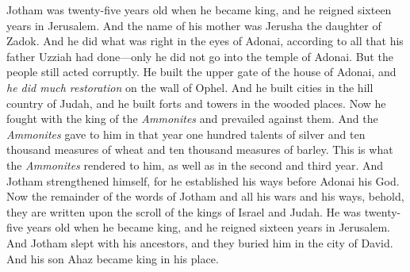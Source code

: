 \begin{biblechapter} %
 Jotham was twenty-five years old when he became king, and he reigned sixteen years in Jerusalem. And the name of his mother was Jerusha the daughter of Zadok.
\verse And he did what was right in the eyes of Adonai, according to all that his father Uzziah had done—only he did not go into the temple of Adonai. But the people still acted corruptly.
\verse He built the upper gate of the house of Adonai, and \textit{he did much restoration} on the wall of Ophel.
\verse And he built cities in the hill country of Judah, and he built forts and towers in the wooded places.
\verse Now he fought with the king of the \textit{Ammonites} and prevailed against them. And the \textit{Ammonites} gave to him in that year one hundred talents of silver and ten thousand measures of wheat and ten thousand measures of barley. This is what the \textit{Ammonites} rendered to him, as well as in the second and third year.
\verse And Jotham strengthened himself, for he established his ways before Adonai his God.
\verse Now the remainder of the words of Jotham and all his wars and his ways, behold, they are written upon the scroll of the kings of Israel and Judah.
\verse He was twenty-five years old when he became king, and he reigned sixteen years in Jerusalem.
\verse And Jotham slept with his ancestors, and they buried him in the city of David. And his son Ahaz became king in his place.
\end{biblechapter}

